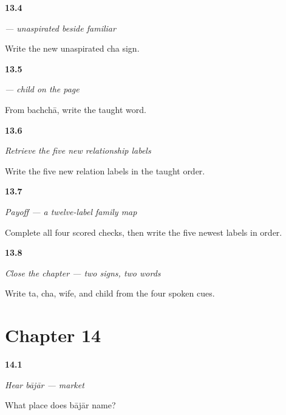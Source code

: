 \noindent\begin{minipage}[t]{\linewidth}
\raggedright
\hypertarget{review-MW-W09-cha-write}{\textbf{13.4}} \emph{ — unaspirated beside familiar }\par
\small Write the new unaspirated cha sign.
\end{minipage}\par\medskip

\noindent\begin{minipage}[t]{\linewidth}
\raggedright
\hypertarget{review-MW-C09-bachcha-dictation}{\textbf{13.5}} \emph{ — child on the page}\par
\small From bachchā, write the taught word.
\end{minipage}\par\medskip

\noindent\begin{minipage}[t]{\linewidth}
\raggedright
\hypertarget{review-MW-R09-family-new-five-recall}{\textbf{13.6}} \emph{Retrieve the five new relationship labels}\par
\small Write the five new relation labels in the taught order.
\end{minipage}\par\medskip

\noindent\begin{minipage}[t]{\linewidth}
\raggedright
\hypertarget{review-MW-C09-family-twelve-payoff}{\textbf{13.7}} \emph{Payoff — a twelve-label family map}\par
\small Complete all four scored checks, then write the five newest labels in order.
\end{minipage}\par\medskip

\noindent\begin{minipage}[t]{\linewidth}
\raggedright
\hypertarget{review-MW-R09-script-close-recall}{\textbf{13.8}} \emph{Close the chapter — two signs, two words}\par
\small Write ta, cha, wife, and child from the four spoken cues.
\end{minipage}\par\medskip

\section*{Chapter 14}

\noindent\begin{minipage}[t]{\linewidth}
\raggedright
\hypertarget{review-MW-C10-hear-bajar-meaning}{\textbf{14.1}} \emph{Hear \emph{bājār} — market}\par
\small What place does bājār name?
\end{minipage}\par\medskip

